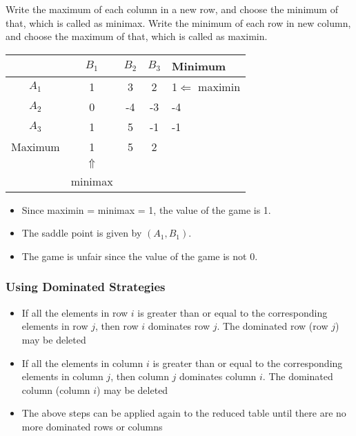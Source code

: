 \documentclass[12pt]{article}
\begin{document}
Write the maximum of each column in a new row, and choose the minimum of that, which is called as minimax. 
Write the minimum of each row in new column, and choose the maximum of that, which is called as maximin.  

\begin{center}
\begin{tabular}{|c|ccc|l|}
\hline
          &       $B_1$  &  $B_2$  &  $B_3$  &                Minimum  \\
\hline
 $A_1$    &           1  &      3  &      2  &  1$\Leftarrow$ maximin  \\
 $A_2$    &           0  &     -4  &     -3  &                     -4  \\
 $A_3$    &           1  &      5  &     -1  &                     -1  \\
\hline
 Maximum  &           1  &      5  &      2  &                         \\
          &  $\Uparrow$  &         &         &                         \\
          &     minimax  &         &         &                         \\
\hline
\end{tabular}
\end{center}



\begin{itemize}
\item Since maximin = minimax = 1, the value of the game is 1.
\item The saddle point is given by $\left(A_1, B_1\right)$.
\item The game is unfair since the value of the game is not 0.
\end{itemize}
\subsubsection{Using Dominated Strategies}

\begin{itemize}
\item If all the elements in row $i$ is greater than or equal to the corresponding elements in row $j$, then row $i$ dominates row $j$. The dominated row (row $j$) may be deleted
\item If all the elements in column $i$ is greater than or equal to the corresponding elements in column $j$, then column $j$ dominates column $i$. The dominated column (column $i$) may be deleted
\item The above steps can be applied again to the reduced table until there are no more dominated rows or columns
\end{itemize}
\end{document}
